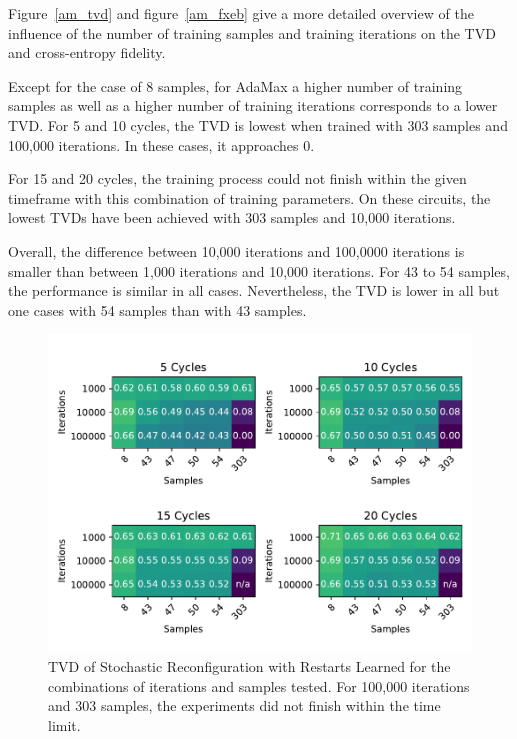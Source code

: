 Figure~\ref{am_tvd} and figure~\ref{am_fxeb} give a more detailed overview of the influence of the 
number of training samples and training iterations on the TVD and cross-entropy fidelity.

Except for the case of 8 samples, for AdaMax a higher number of training samples as well as a higher 
number of training iterations corresponds to a lower TVD. For 5 and 10 cycles, the TVD is lowest
when trained with 303 samples and 100,000 iterations. In these cases, it approaches 0.

For 15 and 20 cycles, the training process could not finish
within the given timeframe with this combination of training parameters. On these circuits, the lowest TVDs have been achieved with 303 samples 
and 10,000 iterations.

Overall, the difference between 10,000 iterations and 100,0000 iterations is smaller than between 
1,000 iterations and 10,000 iterations. For 43 to 54 samples, the performance is similar in all cases.
Nevertheless, the TVD is lower in all but one cases with 54 samples than with 43 samples.

\begin{figure}[H]
  \centering
  \includegraphics[width=\textwidth]{figures/results/AM-restarts-learned/tvd_heatmap.pdf}
  \caption[TVD of AdaMax with Restarts Learned]{TVD of Stochastic 
  Reconfiguration with Restarts Learned for the combinations of iterations and samples tested.
  For 100,000 iterations and 303 samples, the experiments did not finish within the time limit.}
  \label{fig:am_tvd}
\end{figure}

